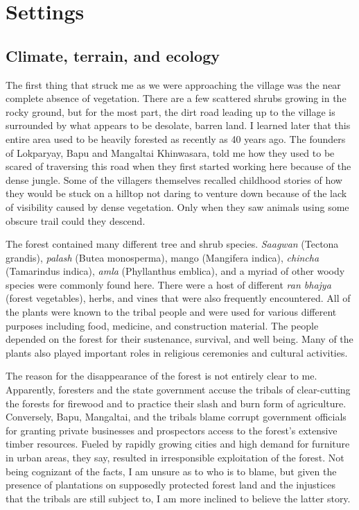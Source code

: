 \documentclass{article}
\begin{document}
\section{Settings}
\subsection{Climate, terrain, and ecology}

The first thing that struck me as we were approaching the village was the near complete absence of vegetation. There are a few scattered shrubs growing in the rocky ground, but for the most part, the dirt road leading up to the village is surrounded by what appears to be desolate, barren land. I learned later that this entire area used to be heavily forested as recently as 40 years ago. The founders of Lokparyay, Bapu and Mangaltai Khinwasara, told me how they used to be scared of traversing this road when they first started working here because of the dense jungle. Some of the villagers themselves recalled childhood stories of how they would be stuck on a hilltop not daring to venture down because of the lack of visibility caused by dense vegetation. Only when they saw animals using some obscure trail could they descend.

The forest contained many different tree and shrub species. \textit{Saagwan} (Tectona grandis), \textit{palash} (Butea monosperma), mango (Mangifera indica), \textit{chincha} (Tamarindus indica), \textit{amla} (Phyllanthus emblica), and a myriad of other woody species were commonly found here. There were a host of different \textit{ran bhajya} (forest vegetables), herbs, and vines that were also frequently encountered. All of the plants were known to the tribal people and were used for various different purposes including food, medicine, and construction material. The people depended on the forest for their sustenance, survival, and well being. Many of the plants also played important roles in religious ceremonies and cultural activities.

The reason for the disappearance of the forest is not entirely clear to me. Apparently, foresters and the state government accuse the tribals of clear-cutting the forests for firewood and to practice their slash and burn form of agriculture. Conversely, Bapu, Mangaltai, and the tribals blame corrupt government officials for granting private businesses and prospectors access to the forest's extensive timber resources. Fueled by rapidly growing cities and high demand for furniture in urban areas, they say, resulted in irresponsible exploitation of the forest. Not being cognizant of the facts, I am unsure as to who is to blame, but given the presence of plantations on supposedly protected forest land and the injustices that the tribals are still subject to, I am more inclined to believe the latter story.
\end{document}

